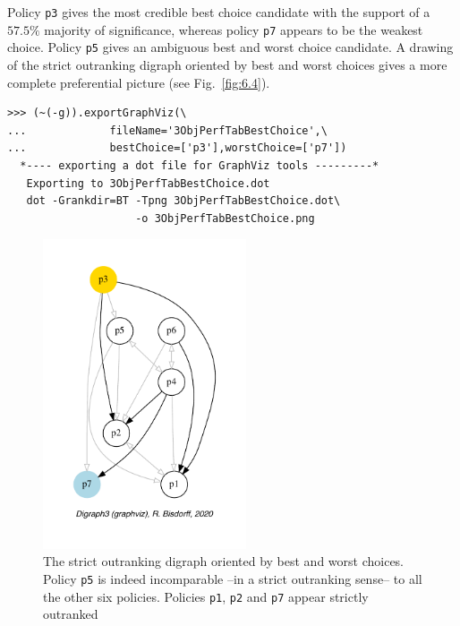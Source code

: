 Policy \texttt{p3} gives the most credible best choice candidate with the support of a $57.5\%$ majority of significance, whereas policy \texttt{p7} appears to be the weakest choice. Policy \texttt{p5} gives an ambiguous best and worst choice candidate. A drawing of the strict outranking digraph oriented by best and worst choices gives a more complete preferential picture (see Fig.~\vref{fig:6.4}).
\begin{lstlisting}
>>> (~(-g)).exportGraphViz(\
...             fileName='3ObjPerfTabBestChoice',\
...             bestChoice=['p3'],worstChoice=['p7'])
  *---- exporting a dot file for GraphViz tools ---------*
   Exporting to 3ObjPerfTabBestChoice.dot
   dot -Grankdir=BT -Tpng 3ObjPerfTabBestChoice.dot\
                    -o 3ObjPerfTabBestChoice.png
\end{lstlisting}
\begin{figure}[ht]
\sidecaption[t]
\includegraphics[width=6cm]{Figures/6-4-3ObjPerfTabBestChoice.pdf}
\caption{The strict outranking digraph oriented by best and worst choices. Policy \texttt{p5} is indeed incomparable --in a strict outranking sense-- to all the other six policies. Policies \texttt{p1}, \texttt{p2} and \texttt{p7} appear strictly outranked}
\label{fig:6.4}       %
\end{figure}

